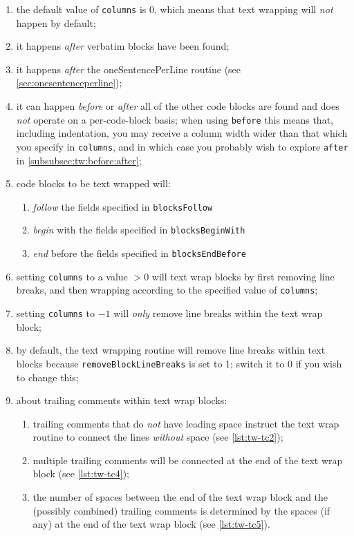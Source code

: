  \begin{enumerate}
  \item the default value of \texttt{columns} is 0, which means that text wrapping will
        \emph{not} happen by default;
  \item it happens \emph{after} verbatim blocks have been found;
  \item it happens \emph{after} the oneSentencePerLine routine (see
        \cref{sec:onesentenceperline});
  \item it can happen \emph{before} or \emph{after}  all of the other code blocks are found and does \emph{not} operate
        on a per-code-block basis; when using \texttt{before} this means that, including
        indentation, you may receive a column width wider than that which you specify in
        \texttt{columns}, and in which case you probably wish to explore \texttt{after}
        in \cref{subsubsec:tw:before:after};
  \item code blocks to be text wrapped will:
        \begin{enumerate}
         \item \emph{follow} the fields specified in \texttt{blocksFollow}
         \item \emph{begin} with the fields specified in \texttt{blocksBeginWith}
         \item \emph{end} before the fields specified in \texttt{blocksEndBefore}
        \end{enumerate}
  \item setting \texttt{columns} to a value $>0$ will text wrap blocks by first removing
      line breaks, and then wrapping according to the specified value of
      \texttt{columns};
  \item setting \texttt{columns} to $-1$ will \emph{only} remove line breaks within the
        text wrap block;
  \item by default, the text wrapping routine will remove line breaks within text blocks
        because \texttt{removeBlockLineBreaks} is set to 1; switch it to 0 if you wish to
        change this;
  \item about trailing comments within text wrap blocks:
        \begin{enumerate}
         \item trailing comments that do \emph{not} have leading space instruct the text
               wrap routine to connect the lines \emph{without} space (see
               \cref{lst:tw-tc2});
         \item multiple trailing comments will be connected at the end of the text wrap
               block (see \cref{lst:tw-tc4});
         \item the number of spaces between the end of the text wrap block and the
               (possibly combined) trailing comments is determined by the spaces (if any)
               at the end of the text wrap block (see \cref{lst:tw-tc5}).
        \end{enumerate}
 \end{enumerate}

